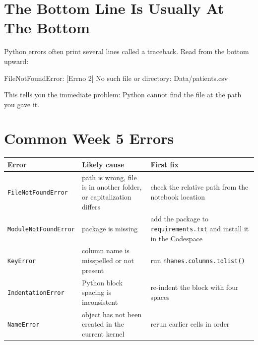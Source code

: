 \documentclass[
  letterpaper,
  DIV=11,
  numbers=noendperiod,
  oneside]{scrreprt}
\newenvironment{Shaded}{\begin{snugshade}}{\end{snugshade}}
\newcommand{\NormalTok}[1]{\textcolor[rgb]{0.00,0.23,0.31}{#1}}
\begin{document}
\section{The Bottom Line Is Usually At The
Bottom}\label{the-bottom-line-is-usually-at-the-bottom}

Python errors often print several lines called a traceback. Read from
the bottom upward:

\begin{Shaded}
\begin{Highlighting}[numbers=left,,]
\NormalTok{FileNotFoundError: [Errno 2] No such file or directory: \textquotesingle{}Data/patients.csv\textquotesingle{}}
\end{Highlighting}
\end{Shaded}

This tells you the immediate problem: Python cannot find the file at the
path you gave it.

\section{Common Week 5 Errors}\label{common-week-5-errors}

\begin{longtable}[]{@{}
  >{\raggedright\arraybackslash}p{}
  >{\raggedright\arraybackslash}p{}
  >{\raggedright\arraybackslash}p{}@{}}
\toprule\noalign{}
\begin{minipage}[b]{\linewidth}\raggedright
Error
\end{minipage} & \begin{minipage}[b]{\linewidth}\raggedright
Likely cause
\end{minipage} & \begin{minipage}[b]{\linewidth}\raggedright
First fix
\end{minipage} \\
\midrule\noalign{}
\endhead
\bottomrule\noalign{}
\endlastfoot
\texttt{FileNotFoundError} & path is wrong, file is in another folder,
or capitalization differs & check the relative path from the notebook
location \\
\texttt{ModuleNotFoundError} & package is missing & add the package to
\texttt{requirements.txt} and install it in the Codespace \\
\texttt{KeyError} & column name is misspelled or not present & run
\texttt{nhanes.columns.tolist()} \\
\texttt{IndentationError} & Python block spacing is inconsistent &
re-indent the block with four spaces \\
\texttt{NameError} & object has not been created in the current kernel &
rerun earlier cells in order \\
\end{longtable}
\end{document}
